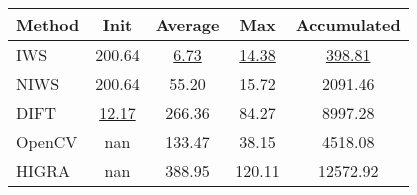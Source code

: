 \begin{table}
\centering
\label{tab:2d_exp}
\begin{tabular}{|l|c|c|c|c|}
\hline
Method & Init & Average & Max & Accumulated \\
\hline
IWS & 200.64 & \underline{6.73} & \underline{14.38} & \underline{398.81} \\
NIWS & 200.64 & 55.20 & 15.72 & 2091.46 \\
DIFT & \underline{12.17} & 266.36 & 84.27 & 8997.28 \\
OpenCV & nan & 133.47 & 38.15 & 4518.08 \\
HIGRA & nan & 388.95 & 120.11 & 12572.92 \\
\hline
\end{tabular}
\end{table}

